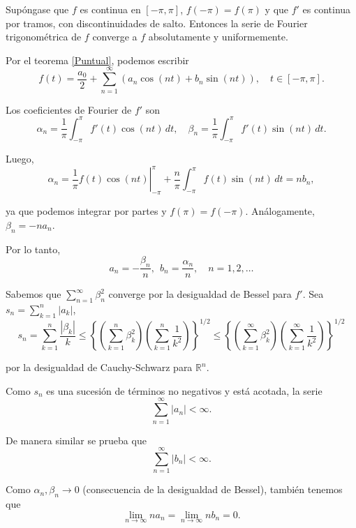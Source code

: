 \begin{teorema} 
Supóngase que $f$ es continua en $[-\pi,\pi]$, $f(-\pi) = f(\pi)$ y que $f'$ es continua por tramos, con discontinuidades de salto. Entonces la serie de Fourier trigonométrica de $f$ converge a $f$ absolutamente y uniformemente.
\end{teorema}


\begin{demo}
Por el teorema \ref{Puntual}, podemos escribir
$$f(t) = \frac{a_0}{2} + \sum_{n=1}^{\infty}(a_n \cos(nt) + b_n \sin(nt)), \quad t \in [-\pi,\pi].$$

Los coeficientes de Fourier de $f'$ son 
$$\alpha_n = \frac{1}{\pi} \int_{-\pi}^{\pi} f'(t) \cos(nt) \,dt, \quad \beta_n = \frac{1}{\pi} \int_{-\pi}^{\pi} f'(t) \sin(nt) \,dt.$$

Luego,
$$\alpha_n = \left. \frac{1}{\pi} f(t) \cos(nt) \right|_{-\pi}^{\pi} + \frac{n}{\pi} \int_{-\pi}^{\pi} f(t) \sin(nt) \,dt = n b_n, $$

ya que podemos integrar por partes y $f(\pi) = f(-\pi)$. Análogamente, $\beta_n = - na_n$.

Por lo tanto, 
$$a_n = - \frac{\beta_n}{n}, ~~ b_n = \frac{\alpha_n}{n}, \quad n = 1,2, \dots$$

Sabemos que $\sum\limits_{n=1}^{\infty} \beta_n^2$ converge por la desigualdad de Bessel para $f'$. Sea $s_n = \sum\limits_{k=1}^n |a_k|$,
$$s_n = \sum_{k=1}^n \frac{|\beta_k|}{k}  \leq \left\{ \left( \sum_{k=1}^n  \beta^2_k \right) \left(\sum_{k=1}^n \frac{1}{k^2} \right) \right\}^{1/2} \leq \left\{ \left( \sum_{k=1}^{\infty}  \beta^2_k \right) \left(\sum_{k=1}^{\infty}  \frac{1}{k^2} \right) \right\}^{1/2}  $$

por la desigualdad de Cauchy-Schwarz para $\mathbb{R}^n$. 

Como $s_n$ es una sucesión de términos no negativos y está acotada, la serie
\begin{equation}
    \sum_{n=1}^{\infty} |a_n| < \infty. \label{uniforme1}
\end{equation}

De manera similar se prueba que 
\begin{equation}
    \sum_{n=1}^{\infty} |b_n| < \infty. \label{uniforme2}
\end{equation}

Como $\alpha_n, \beta_n \to 0$ (consecuencia de la desigualdad de Bessel), también tenemos que  
$$\lim_{n \to \infty} n a_n = \lim_{n \to \infty} n b_n = 0.$$


\end{demo}
